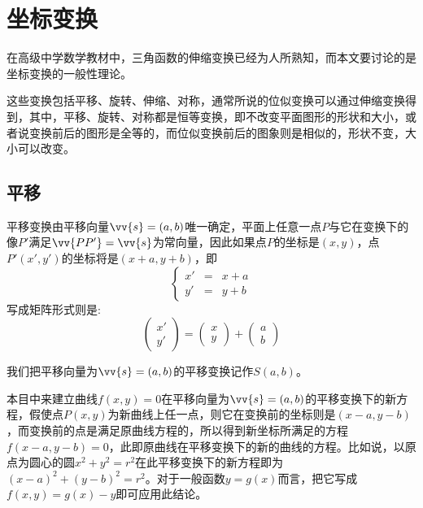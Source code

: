 
\section{坐标变换}
\label{sec:codinatie-axias-rotation}

在高级中学数学教材中，三角函数的伸缩变换已经为人所熟知，而本文要讨论的是坐标变换的一般性理论。

这些变换包括平移、旋转、伸缩、对称，通常所说的位似变换可以通过伸缩变换得到，其中，平移、旋转、对称都是恒等变换，即不改变平面图形的形状和大小，或者说变换前后的图形是全等的，而位似变换前后的图象则是相似的，形状不变，大小可以改变。

\subsection{平移}

平移变换由平移向量$\vv{s}=(a,b)$唯一确定，平面上任意一点$P$与它在变换下的像$P'$满足$\vv{PP'}=\vv{s}$为常向量，因此如果点$P$的坐标是$(x,y)$，点$P'(x',y')$的坐标将是$(x+a, y+b)$，即
\begin{equation}
  \label{eq:shift-translation-coordinate-formula}
  \left\{
      \begin{array}{ccc}
        x' & = & x + a \\
        y' & = & y + b
      \end{array}
  \right.
\end{equation}
写成矩阵形式则是:
\begin{equation}
  \label{eq:shift-translation-coordinate-formula-matrix}
  \left(
    \begin{array}{c}
      x' \\
      y' 
    \end{array}
  \right)
  =
  \left(
    \begin{array}{c}
      x \\
      y
    \end{array}
  \right)
  +
  \left(
    \begin{array}{c}
      a \\
      b 
    \end{array}
  \right)
\end{equation}

我们把平移向量为$\vv{s}=(a,b)$的平移变换记作$S(a,b)$。

\begin{example}
  本目中来建立曲线$f(x,y)=0$在平移向量为$\vv{s}=(a,b)$的平移变换下的新方程，假使点$P(x,y)$为新曲线上任一点，则它在变换前的坐标则是$(x-a,y-b)$，而变换前的点是满足原曲线方程的，所以得到新坐标所满足的方程$f(x-a,y-b)=0$，此即原曲线在平移变换下的新的曲线的方程。比如说，以原点为圆心的圆$x^2+y^2=r^2$在此平移变换下的新方程即为$(x-a)^2+(y-b)^2=r^2$。对于一般函数$y=g(x)$而言，把它写成$f(x,y)=g(x)-y$即可应用此结论。
\end{example}

